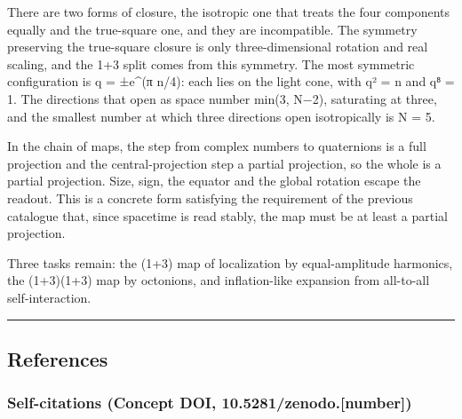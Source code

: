 \documentclass[
  a4paper,
]{article}
\begin{document}
There are two forms of closure, the isotropic one that treats the four
components equally and the true-square one, and they are incompatible.
The symmetry preserving the true-square closure is only
three-dimensional rotation and real scaling, and the 1+3 split comes
from this symmetry. The most symmetric configuration is q = ±e\^{}(π
n/4): each lies on the light cone, with q² = n and q⁸ = 1. The
directions that open as space number min(3, N−2), saturating at three,
and the smallest number at which three directions open isotropically is
N = 5.

In the chain of maps, the step from complex numbers to quaternions is a
full projection and the central-projection step a partial projection, so
the whole is a partial projection. Size, sign, the equator and the
global rotation escape the readout. This is a concrete form satisfying
the requirement of the previous catalogue that, since spacetime is read
stably, the map must be at least a partial projection.

Three tasks remain: the (1+3) map of localization by equal-amplitude
harmonics, the (1+3)(1+3) map by octonions, and inflation-like expansion
from all-to-all self-interaction.

\begin{center}\rule{0.5\linewidth}{0.5pt}\end{center}

\subsection{References}\label{references}

\subsubsection{Self-citations (Concept DOI,
10.5281/zenodo.{[}number{]})}\label{self-citations-concept-doi-10.5281zenodo.number}
\end{document}
